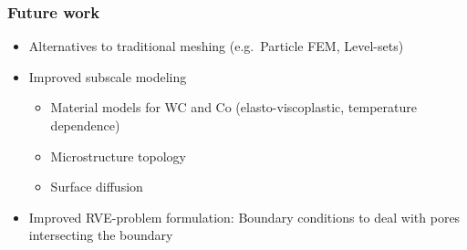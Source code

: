 \documentclass[11pt]{beamer} %
\newcommand{\roughcite}[1]{\textsc{#1}}
\begin{document}
\begin{frame}
 \frametitle{Future work}
 \begin{itemize}
  \item Alternatives to traditional meshing (e.g.\ Particle FEM, Level-sets)
  \item Improved subscale modeling
   \begin{itemize}
    \item Material models for WC and Co (elasto-viscoplastic, temperature dependence)
    \item Microstructure topology
    \item Surface diffusion
   \end{itemize}
  \item Improved RVE-problem formulation: Boundary conditions to deal with pores intersecting the boundary
 \end{itemize}
\end{frame}



% 
% 
\end{document}
